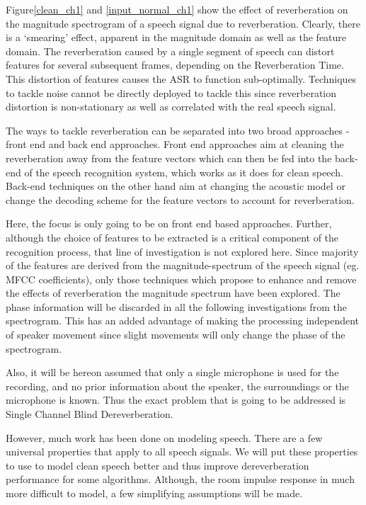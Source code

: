 \documentclass[12pt, a4paper, oneside]{book}
\begin{document}
Figure\ref{clean_ch1} and \ref{input_normal_ch1} show the effect of reverberation on the magnitude spectrogram of a speech signal due to reverberation. Clearly, there is a ‘smearing’ effect, apparent in the magnitude domain as well as the feature domain. The reverberation caused by a single segment of speech can distort features for several subsequent frames, depending on the Reverberation Time. This distortion of features causes the ASR to function sub-optimally. Techniques to tackle noise cannot be directly deployed to tackle this since reverberation distortion is non-stationary as well as correlated with the real speech signal.

The ways to tackle reverberation can be separated into two broad approaches - front end and back end approaches. Front end approaches aim at cleaning the reverberation away from the feature vectors which can then be fed into the back-end of the speech recognition system, which works as it does for clean speech. Back-end techniques on the other hand aim at changing the acoustic model or change the decoding scheme for the feature vectors to account for reverberation. 

Here, the focus is only going to be on front end based approaches. Further, although the choice of features to be extracted is a critical component of the recognition process, that line of investigation is not explored here. Since majority of the features are derived from the magnitude-spectrum of the speech signal (eg. MFCC coefficients), only those techniques which propose to enhance and remove the effects of reverberation the magnitude spectrum have been explored. The phase information will be discarded in all the following investigations from the spectrogram. This has an added advantage of making the processing independent of speaker movement  since slight movements will only change the phase of the spectrogram.

Also, it will be hereon assumed that only a single microphone is used for the recording, and no prior information about the speaker, the surroundings or the microphone is known. Thus the exact problem that is going to be addressed is Single Channel Blind Dereverberation. 

However, much work has been done on modeling speech. There are a few universal properties that apply to all speech signals. We will put these properties to use to model clean speech better and thus improve dereverberation performance for some algorithms. Although, the room impulse response in much more difficult to model, a few simplifying assumptions will be made.
\end{document}
